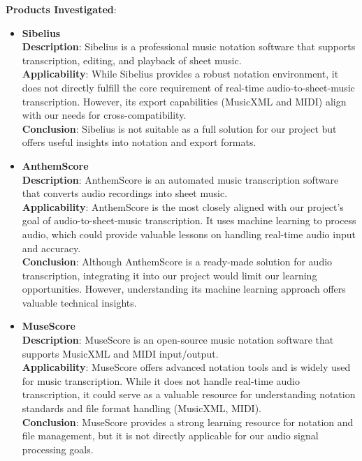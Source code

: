 \documentclass[12pt]{article}
\begin{document}
\textbf{Products Investigated}:
\begin{itemize}
    \item \textbf{Sibelius}~\cite{sibelius}\\
    \textbf{Description}: Sibelius is a professional music notation software that supports transcription, editing, and playback of sheet music.\\
    \textbf{Applicability}: While Sibelius provides a robust notation environment, it does not directly fulfill the core requirement of real-time audio-to-sheet-music transcription. However, its export capabilities (MusicXML and MIDI) align with our needs for cross-compatibility.\\
    \textbf{Conclusion}: Sibelius is not suitable as a full solution for our project but offers useful insights into notation and export formats.
    
    \item \textbf{AnthemScore}\cite{AnthemScore}\\
    \textbf{Description}: AnthemScore is an automated music transcription software that converts audio recordings into sheet music.\\
    \textbf{Applicability}: AnthemScore is the most closely aligned with our project’s goal of audio-to-sheet-music transcription. It uses machine learning to process audio, which could provide valuable lessons on handling real-time audio input and accuracy.\\
    \textbf{Conclusion}: Although AnthemScore is a ready-made solution for audio transcription, integrating it into our project would limit our learning opportunities. However, understanding its machine learning approach offers valuable technical insights.
    
    \item \textbf{MuseScore}\cite{MuseScore}\\
    \textbf{Description}: MuseScore is an open-source music notation software that supports MusicXML and MIDI input/output.\\
    \textbf{Applicability}: MuseScore offers advanced notation tools and is widely used for music transcription. While it does not handle real-time audio transcription, it could serve as a valuable resource for understanding notation standards and file format handling (MusicXML, MIDI).\\
    \textbf{Conclusion}: MuseScore provides a strong learning resource for notation and file management, but it is not directly applicable for our audio signal processing goals.
    

\end{itemize}
\end{document}
